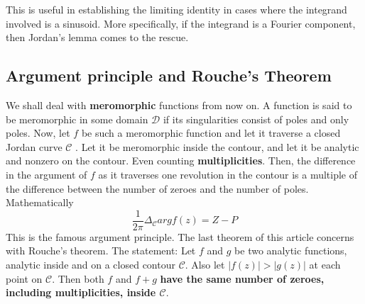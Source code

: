 \documentclass[11pt]{article}
\begin{document}
\begin{sloppypar}
This is useful in establishing the limiting identity in cases where the integrand involved is a sinusoid. More specifically, if the integrand is a Fourier component, then Jordan\rq{}s lemma comes to the rescue.

\subsection{Argument principle and Rouche\rq{}s Theorem}
We shall deal with \textbf{meromorphic} functions from now on. A function is said to be meromorphic in some domain $\mathcal{D}$ if its singularities consist of poles and only poles. Now, let $f$ be such a meromorphic function and let it traverse a closed Jordan curve $\mathcal{C}$ .  Let it be meromorphic inside the contour, and let it be analytic and nonzero on the contour. Even counting \textbf{multiplicities}. Then, the difference in the argument of $f$ as it traverses one revolution in the contour is a multiple of the difference between the number of zeroes and the number of poles. Mathematically
$$\frac{1}{2\pi}\Delta_{\mathcal{C}} arg f(z) = Z-P$$
This is the famous argument principle. The last theorem of this article concerns with Rouche\rq{}s theorem. The statement: Let $f$ and $g$ be two analytic functions, analytic inside and on a closed contour $\mathcal{C}$. Also let $|f(z)|>|g(z)|$ at each point on $\mathcal{C}$. Then both $f$ and $f+g$\textbf{ have the same number of zeroes, including multiplicities, inside $\mathcal{C}$}.
\end{sloppypar}
\end{document}
